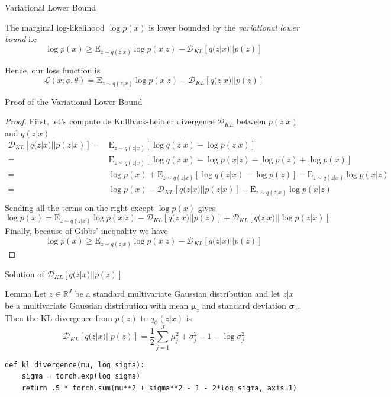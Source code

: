 \documentclass{beamer}
\newcommand{\real}{\mathbb{R}}
\newcommand{\kldiv}{\mathcal{D}_{KL}}
\newcommand{\E}{\mathrm{E}}
\begin{document}
\begin{frame}{Variational Lower Bound}
	\begin{corollary}
		The marginal log-likelihood $\log p(x)$ is lower bounded by the \textit{variational lower bound} i.e
		\[
			\log p(x)  \geq \E_{z\sim q(z|x)}\log p(x|z)- \kldiv[q(z|x)||p(z)]
		\]
	\end{corollary}
	Hence, our loss function is
	\Large
	\[
		\mathcal{L}(x;\phi, \theta) = \E_{z\sim q(z|x)}\log p(x|z)- \kldiv[q(z|x)||p(z)]
	\] 
\end{frame} 

\begin{frame}{Proof of the Variational Lower Bound}
	\begin{proof}
		\scriptsize
		First, let's compute de Kullback-Leibler divergence $\kldiv$ between $p(z|x)$ and $q(z|x)$
		\begin{equation*}
		\begin{split}
		\kldiv[q(z|x)||p(z|x)] 
		=& \E_{z\sim q(z|x)}[ \log q(z|x) - \log p(z|x)]\\
		=& \E_{z\sim q(z|x)}[ \log q(z|x) - \log p(x|z) - \log p(z) + \log p(x)]\\
		=& \log p(x) + \E_{z\sim q(z|x)}[ \log q(z|x)  - \log p(z)] - \E_{z\sim q(z|x)}\log p(x|z)\\
		=& \log p(x) - \kldiv[q(z|x)||p(z|x)] - \E_{z\sim q(z|x)}\log p(x|z)\\
		\end{split}
		\end{equation*}
		Sending all the terms on the right except $\log p(x)$ gives
		\[
			\log p(x) = \E_{z\sim q(z|x)}\log p(x|z)- \kldiv[q(z|x)||p(z)] + \kldiv[q(z|x)||\log p(z|x)]
		\]
		Finally, because of Gibbs' inequality we have
		\[
			\boxed{\log p(x)  \geq \E_{z\sim q(z|x)}\log p(x|z)- \kldiv[q(z|x)||p(z)]}
		\]
	\end{proof}
\end{frame}

\begin{frame}[fragile]{Solution of $\kldiv[q(z|x)||p(z)]$}
	\begin{block}{Lemma}
		Let $z\in \real^J$ be a standard multivariate Gaussian distribution and let $z|x$ be a multivariate Gaussian distribution with mean $\bm{\mu}_z$ and standard deviation $\bm{\sigma}_z$. Then the KL-divergence from $p(z)$ to $q_\phi(z|x)$ is 
		\begin{equation*}
		\kldiv[q(z|x)||p(z)] 
		= \frac{1}{2}\sum_{j=1}^J \mu_j^2 + \sigma_j^2 - 1 - \log \sigma_j^2
		\end{equation*}
	\end{block}
\begin{verbatim}
def kl_divergence(mu, log_sigma):
    sigma = torch.exp(log_sigma)
    return .5 * torch.sum(mu**2 + sigma**2 - 1 - 2*log_sigma, axis=1)
\end{verbatim}
\end{frame}
\end{document}
